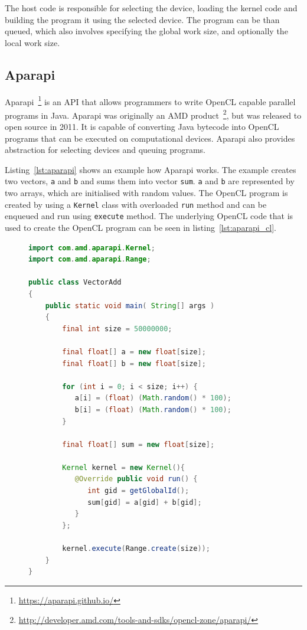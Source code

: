 \documentclass{l4proj}
\begin{document}
The host code is responsible for selecting the device, loading the kernel code and building the 
program it using the selected device. The program can be than queued, which also involves specifying
the global work size, and optionally the local work size.

\subsection{Aparapi}

Aparapi~\footnote{\url{https://aparapi.github.io/}} is an API that allows programmers
to write OpenCL capable parallel programs in Java. Aparapi was originally an AMD 
product~\footnote{\url{http://developer.amd.com/tools-and-sdks/opencl-zone/aparapi/}},
but was released to open source in 2011. It is capable of converting Java bytecode
into OpenCL programs that can be executed on computational devices. Aparapi also 
provides abstraction for selecting devices and queuing programs. 

Listing~\ref{lst:aparapi} shows an example how Aparapi works. The example creates two 
vectors, \texttt{a} and \texttt{b} and sums them into vector \texttt{sum}. \texttt{a} and \texttt{b}
are represented by two arrays, which are initialised with random values. The OpenCL program
is created by using a \texttt{Kernel} class with overloaded \texttt{run} method and 
can be enqueued and run using \texttt{execute} method. The underlying OpenCL code that
is used to create the OpenCL program can be seen in listing~\ref{lst:aparapi_cl}.
\begin{figure}
  \begin{lstlisting}[language=Java]
import com.amd.aparapi.Kernel;
import com.amd.aparapi.Range;

public class VectorAdd 
{
    public static void main( String[] args )
    {
        final int size = 50000000;

        final float[] a = new float[size];
        final float[] b = new float[size];

        for (int i = 0; i < size; i++) {
           a[i] = (float) (Math.random() * 100);
           b[i] = (float) (Math.random() * 100);
        }

        final float[] sum = new float[size];

        Kernel kernel = new Kernel(){
           @Override public void run() {
              int gid = getGlobalId();
              sum[gid] = a[gid] + b[gid];
           }
        };
        
        kernel.execute(Range.create(size));
    }
}    
  \end{lstlisting}
\end{figure}
\end{document}
